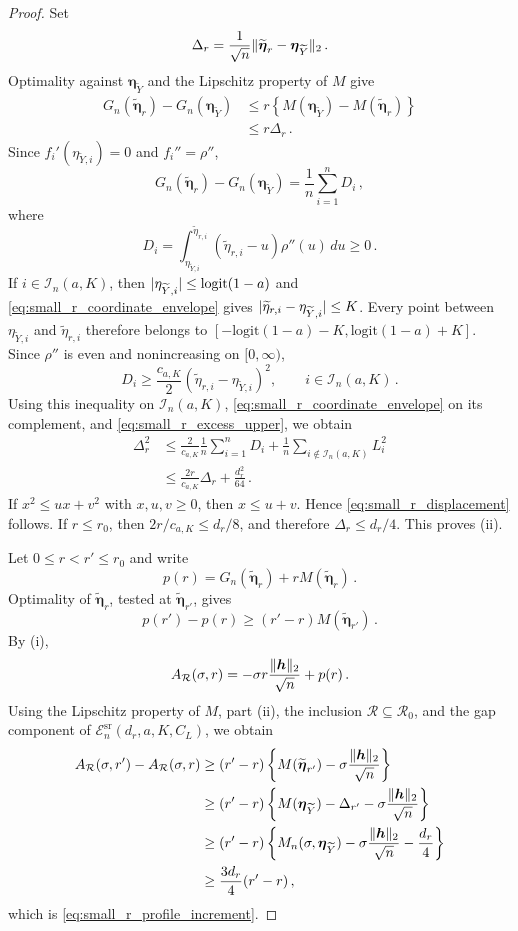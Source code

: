 \documentclass{article}
\makeatletter
\theoremstyle{definition}
\newcommand{\vnorm}[1]{%
	\ensuremath{%
		\if@display
		\left\| #1 \right\|
		\else
		\| #1 \|
		\fi
	}%
}
\newcommand{\abs}[1]{%
	\ensuremath{%
		\if@display
		\left| #1 \right|
		\else
		\lvert #1 \rvert
		\fi
	}%
}
\newcommand*{\bb}{\boldsymbol}
\newcommand{\logit}[1]{\ensuremath{\textrm{logit}(#1)}}
\def\bh{\bb{h}}
\def\Ytil{\widetilde{Y}}
\def\bEtaYtil{\bb{\eta}_{\Ytil}}
\makeatother
\begin{document}
\begin{bibunit}
\begin{proof}
Set
$$
	\Delta_r
	=
	\frac1{\sqrt n}
	\vnorm{
		\widetilde{\bb\eta}_r-\bEtaYtil
	}_2\,.
$$
Optimality against $\bEtaYtil$ and the Lipschitz property of $M$ give
\begin{equation}
\label{eq:small_r_excess_upper}
\begin{aligned}
	G_n(\widetilde{\bb\eta}_r)
	-
	G_n(\bEtaYtil)
	&\leq
	r
	\left\{
		M(\bEtaYtil)-M(\widetilde{\bb\eta}_r)
	\right\}
	\\
	&\leq
	r\Delta_r\,.
\end{aligned}
\end{equation}
Since $f_i'(\eta_{\Ytil,i})=0$ and $f_i''=\rho''$,
$$
	G_n(\widetilde{\bb\eta}_r)
	-
	G_n(\bEtaYtil)
	=
	\frac1n\sum_{i=1}^nD_i\,,
$$
where
$$
	D_i
	=
	\int_{\eta_{\Ytil,i}}^{\widetilde\eta_{r,i}}
	(\widetilde\eta_{r,i}-u)\rho''(u)\,du
	\geq
	0\,.
$$
If $i\in\mathcal I_n(a,K)$, then
$\abs{\eta_{\Ytil,i}}\leq\logit{1-a}$ and
\eqref{eq:small_r_coordinate_envelope} gives
$\abs{\widetilde\eta_{r,i}-\eta_{\Ytil,i}}\leq K$. Every point between
$\eta_{\Ytil,i}$ and $\widetilde\eta_{r,i}$ therefore belongs to
$[-\logit{1-a}-K,\logit{1-a}+K]$. Since $\rho''$ is even and nonincreasing on
$[0,\infty)$,
$$
	D_i
	\geq
	\frac{c_{a,K}}2
	(\widetilde\eta_{r,i}-\eta_{\Ytil,i})^2,
	\qquad
	i\in\mathcal I_n(a,K)\,.
$$
Using this inequality on $\mathcal I_n(a,K)$,
\eqref{eq:small_r_coordinate_envelope} on its complement, and
\eqref{eq:small_r_excess_upper}, we obtain
$$
\begin{aligned}
	\Delta_r^2
	&\leq
	\frac{2}{c_{a,K}}
	\frac1n\sum_{i=1}^nD_i
	+
	\frac1n
	\sum_{i\notin\mathcal I_n(a,K)}L_i^2
	\\
	&\leq
	\frac{2r}{c_{a,K}}\Delta_r
	+
	\frac{d_r^2}{64}\,.
\end{aligned}
$$
If $x^2\leq ux+v^2$ with $x,u,v\geq0$, then $x\leq u+v$. Hence
\eqref{eq:small_r_displacement} follows. If
$r\leq r_0$, then
$2r/c_{a,K}\leq d_r/8$, and therefore $\Delta_r\leq d_r/4$. This proves
(ii).

Let $0\leq r<r'\leq r_0$ and write
$$
	p(r)
	=
	G_n(\widetilde{\bb\eta}_r)
	+
	rM(\widetilde{\bb\eta}_r)\,.
$$
Optimality of $\widetilde{\bb\eta}_r$, tested at
$\widetilde{\bb\eta}_{r'}$, gives
$$
	p(r')-p(r)
	\geq
	(r'-r)M(\widetilde{\bb\eta}_{r'})\,.
$$
By (i),
$$
	A_{\mathcal R}(\sigma,r)
	=
	-\sigma r\frac{\vnorm{\bh}_2}{\sqrt n}
	+
	p(r)\,.
$$
Using the Lipschitz property of $M$, part (ii), the inclusion
$\mathcal R\subseteq\mathcal R_0$, and the gap component of
$\mathcal E_n^{\mathrm{sr}}(d_r,a,K,C_L)$, we obtain
$$
\begin{aligned}
	A_{\mathcal R}(\sigma,r')
	-
	A_{\mathcal R}(\sigma,r)
	&\geq
	(r'-r)
	\left\{
		M(\widetilde{\bb\eta}_{r'})
		-
		\sigma\frac{\vnorm{\bh}_2}{\sqrt n}
	\right\}
	\\
	&\geq
	(r'-r)
	\left\{
		M(\bEtaYtil)
		-
		\Delta_{r'}
		-
		\sigma\frac{\vnorm{\bh}_2}{\sqrt n}
	\right\}
	\\
	&\geq
	(r'-r)
	\left\{
		M_n(\sigma,\bEtaYtil)
		-
		\sigma\frac{\vnorm{\bh}_2}{\sqrt n}
		-
		\frac{d_r}{4}
	\right\}
	\\
	&\geq
	\frac{3d_r}{4}(r'-r)\,,
\end{aligned}
$$
which is \eqref{eq:small_r_profile_increment}.


\end{proof}
\end{bibunit}
\end{document}
